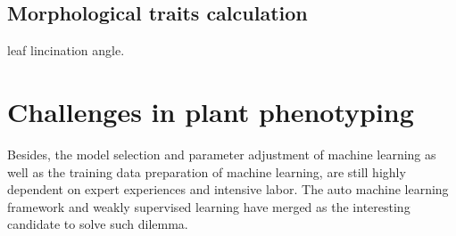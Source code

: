 \subsection{Morphological traits calculation}




leaf lincination angle.








\section{Challenges in plant phenotyping}


Besides, the model selection and parameter adjustment of machine learning as well as the training data preparation of machine learning, are still highly dependent on expert experiences and intensive labor. The auto machine learning framework and weakly supervised learning have merged as the interesting candidate to solve such dilemma.

